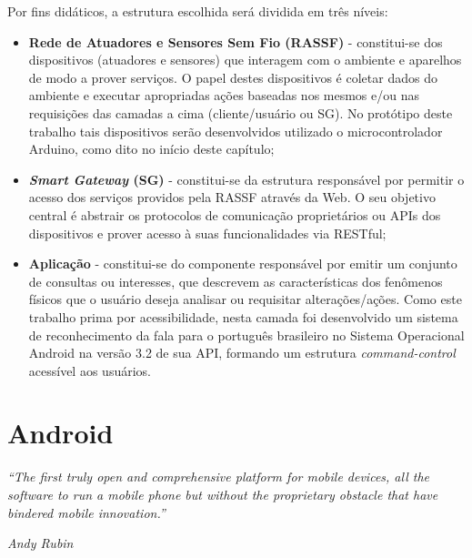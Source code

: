 \documentclass[12pt,a4paper,oneside]{report}
\begin{document}
Por fins didáticos, a estrutura escolhida será dividida em três níveis:
\begin{itemize}
    \item \textbf{Rede de Atuadores e Sensores Sem Fio (RASSF)} - constitui-se dos dispositivos (atuadores e sensores) que interagem com o ambiente e aparelhos de modo a prover serviços. O papel destes dispositivos é coletar dados do ambiente e executar apropriadas ações baseadas nos mesmos e/ou nas requisições das camadas a cima (cliente/usuário ou SG). No protótipo deste trabalho tais dispositivos serão desenvolvidos utilizado o microcontrolador Arduino, como dito no início deste capítulo;
    \item \textbf{\emph{Smart Gateway} (SG)} - constitui-se da estrutura responsável por permitir o acesso dos serviços providos pela RASSF através da Web. O seu objetivo central é abstrair os protocolos de comunicação proprietários ou APIs dos dispositivos e prover acesso à suas funcionalidades via RESTful;
    \item \textbf{Aplicação} - constitui-se do componente responsável por emitir um conjunto de consultas ou interesses, que descrevem as características dos fenômenos físicos que o usuário deseja analisar ou requisitar alterações/ações. Como este trabalho prima por acessibilidade, nesta camada foi desenvolvido um sistema de reconhecimento da fala para o português brasileiro no Sistema Operacional Android na versão 3.2 de sua API, formando um estrutura \emph{command-control} acessível aos usuários.
\end{itemize}

%
%
\section{Android}

\begin{center}
\begin{minipage}{.8\textwidth}
\emph{``The first truly open and comprehensive platform for mobile devices, all the software to run a mobile phone but without the proprietary obstacle that have bindered mobile innovation.''}
\begin{flushright}
    \begin{minipage}{.3\textwidth}
	\emph{Andy Rubin}\cite{Andy Rubin}
    \end{minipage}
\end{flushright}

\end{minipage}
\end{center}
\end{document}
